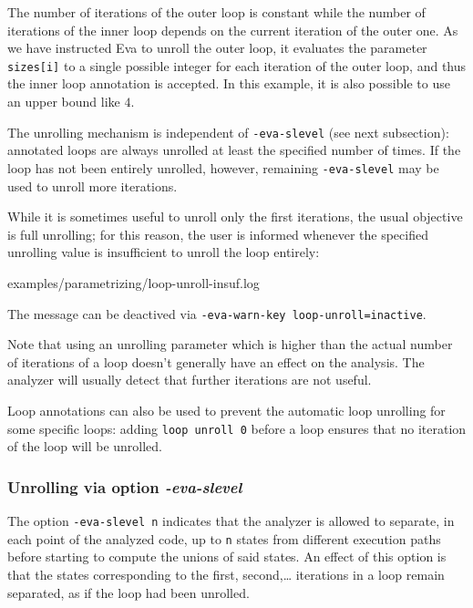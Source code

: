 \documentclass[web]{frama-c-book}
\newcommand{\Eva}{\textsf{Eva}}
\begin{document}


The number of iterations of the outer loop is constant while the number of
iterations of the inner loop depends on the current iteration of the outer
one. As we have instructed \Eva{} to unroll the outer loop, it evaluates the
parameter \lstinline|sizes[i]| to a single possible integer for each iteration
of the outer loop, and thus the inner loop annotation is accepted. In this
example, it is also possible to use an upper bound like $4$.

The unrolling mechanism is independent of \lstinline|-eva-slevel|
(see next subsection): annotated loops are always unrolled at least the specified
number of times. If the loop has not been entirely unrolled, however,
remaining \lstinline|-eva-slevel| may be used to unroll more iterations.

While it is sometimes useful to unroll only the first iterations, the usual
objective is full unrolling; for this reason, the user is informed whenever
the specified unrolling value is insufficient to unroll the loop entirely:

\begin{minipage}{\linewidth}%

\end{minipage}


  {examples/parametrizing/loop-unroll-insuf.log}

The message can be deactived via \lstinline|-eva-warn-key loop-unroll=inactive|.

Note that using an unrolling parameter which is higher than the actual number
of iterations of a loop doesn't generally have an effect on the analysis.
The analyzer will usually detect that further iterations are not useful.

Loop annotations can also be used to prevent the automatic loop unrolling
for some specific loops: adding \lstinline|loop unroll 0| before a loop
ensures that no iteration of the loop will be unrolled.

\subsubsection{Unrolling via option {\em -eva-slevel}}
\label{slevel}

The option \lstinline|-eva-slevel n| indicates that the analyzer is allowed
to separate, in each point of the analyzed code,
up to \lstinline|n| states from different execution paths before starting
to compute the unions of said states. An effect of this option
is that the states corresponding to the first, second,\ldots
iterations in a loop remain separated, as if the loop had been unrolled.
\end{document}

